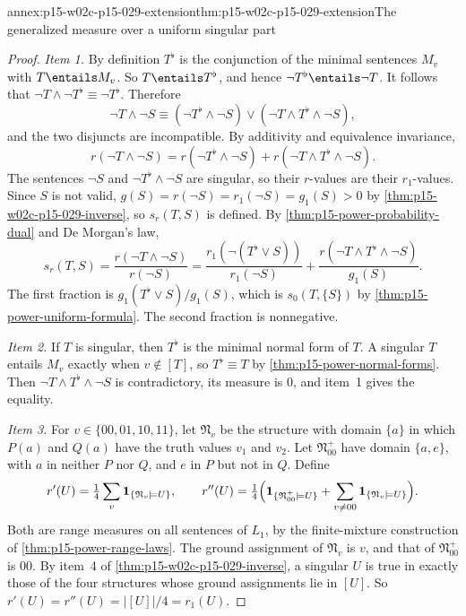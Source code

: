 \begin{annexitem}{annex:p15-w02c-p15-029-extension}{thm:p15-w02c-p15-029-extension}{The generalized measure over a uniform singular part}
\begin{proof}
\emph{Item 1.} By definition \(T^\flat\) is the conjunction of the
minimal sentences \(M_v\) with \(T\entails M_v\). So \(T\entails T^\flat\),
and hence \(\neg T^\flat\entails\neg T\). It follows that
\(\neg T\land\neg T^\flat\equiv\neg T^\flat\). Therefore
\[
 \neg T\land\neg S\equiv
 (\neg T^\flat\land\neg S)\lor(\neg T\land T^\flat\land\neg S),
\]
and the two disjuncts are incompatible. By additivity and equivalence
invariance,
\[
 r(\neg T\land\neg S)=r(\neg T^\flat\land\neg S)
 +r(\neg T\land T^\flat\land\neg S).
\]
The sentences \(\neg S\) and \(\neg T^\flat\land\neg S\) are singular, so
their \(r\)-values are their \(r_1\)-values. Since \(S\) is not valid,
\(g(S)=r(\neg S)=r_1(\neg S)=g_1(S)>0\) by
\cref{thm:p15-w02c-p15-029-inverse}, so \(s_r(T,S)\) is defined. By
\cref{thm:p15-power-probability-dual} and De Morgan's law,
\[
 s_r(T,S)=\frac{r(\neg T\land\neg S)}{r(\neg S)}
 =\frac{r_1(\neg(T^\flat\lor S))}{r_1(\neg S)}
 +\frac{r(\neg T\land T^\flat\land\neg S)}{g_1(S)} .
\]
The first fraction is \(g_1(T^\flat\lor S)/g_1(S)\), which is
\(s_0(T,\{S\})\) by \cref{thm:p15-power-uniform-formula}. The second
fraction is nonnegative.

\emph{Item 2.} If \(T\) is singular, then \(T^\flat\) is the minimal
normal form of \(T\). A singular \(T\) entails \(M_v\) exactly when
\(v\notin[T]\), so \(T^\flat\equiv T\) by
\cref{thm:p15-power-normal-forms}. Then
\(\neg T\land T^\flat\land\neg S\) is contradictory, its measure is
\(0\), and item~1 gives the equality.

\emph{Item 3.} For \(v\in\{00,01,10,11\}\), let \(\mathfrak N_v\) be the
structure with domain \(\{a\}\) in which \(P(a)\) and \(Q(a)\) have the
truth values \(v_1\) and \(v_2\). Let \(\mathfrak N_{00}^+\) have domain
\(\{a,e\}\), with \(a\) in neither \(P\) nor \(Q\), and \(e\) in \(P\)
but not in \(Q\). Define
\[
 r'(U)=\tfrac14\sum_{v}\mathbf 1_{\{\mathfrak N_v\models U\}},
 \qquad
 r''(U)=\tfrac14\Bigl(\mathbf 1_{\{\mathfrak N_{00}^+\models U\}}
   +\sum_{v\neq00}\mathbf 1_{\{\mathfrak N_v\models U\}}\Bigr).
\]
Both are range measures on all sentences of \(L_1\), by the
finite-mixture construction of \cref{thm:p15-power-range-laws}. The
ground assignment of \(\mathfrak N_v\) is \(v\), and that of
\(\mathfrak N_{00}^+\) is \(00\). By item~4 of
\cref{thm:p15-w02c-p15-029-inverse}, a singular \(U\) is true in exactly
those of the four structures whose ground assignments lie in \([U]\). So
\(r'(U)=r''(U)=|[U]|/4=r_1(U)\).


\end{proof}
\end{annexitem}
